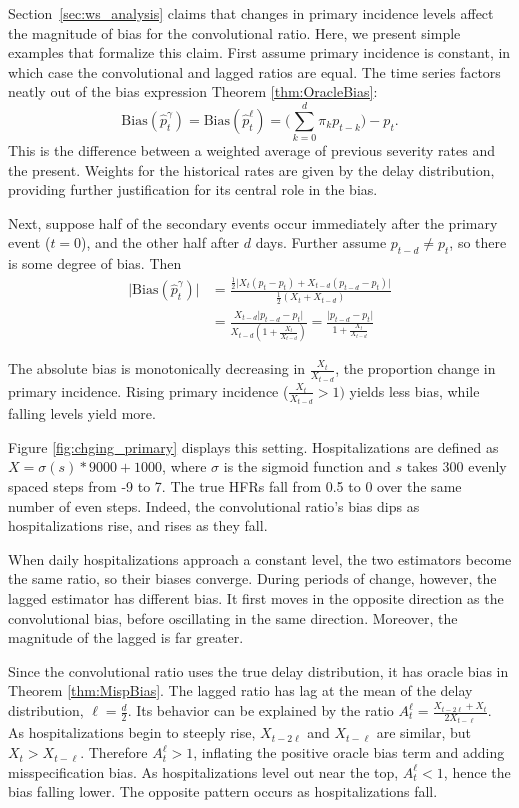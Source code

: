 \documentclass{article}
\begin{document}
Section~\ref{sec:ws_analysis} claims that changes in primary incidence levels affect the magnitude of bias for the convolutional ratio. Here, we present simple examples that formalize this claim. First assume primary incidence is constant, in which case the convolutional and lagged ratios are equal. The time series factors neatly out of the bias expression  Theorem \ref{thm:OracleBias}:
$$\text{Bias}(\hat{p}_t^{\gamma}) = \text{Bias}(\hat{p}_t^\ell) = \Big(\sum_{k=0}^d \pi_k p_{t-k}\Big)-p_t.$$
\noindent This is the difference between a weighted average of previous severity rates and the present. Weights for the historical rates are given by the delay distribution, providing further justification for its central role in the bias. 

Next, suppose half of the secondary events occur immediately after the primary event ($t=0$), and the other half after $d$ days. Further assume $p_{t-d}\neq p_t$, so there is some degree of bias. Then
\begin{align*}
    \lvert\text{Bias}(\hat{p}_t^{\gamma})\rvert &= \frac{\frac{1}{2}\big\lvert X_{t}(p_t-p_t) + X_{t-d}(p_{t-d}-p_t)\big\rvert}{\frac{1}{2}(X_{t}+X_{t-d})} \\
    &=\frac{X_{t-d}\lvert p_{t-d}-p_t\rvert}{X_{t-d}(1+\frac{X_{t}}{X_{t-d}})} = \frac{\lvert p_{t-d}-p_t \rvert}{1+\frac{X_{t}}{X_{t-d}}}
\end{align*}

The absolute bias is monotonically decreasing in $\frac{X_{t}}{X_{t-d}}$, the proportion change in primary incidence. Rising primary incidence ($\frac{X_{t}}{X_{t-d}}>1)$ yields less bias, while falling levels yield more.

Figure \ref{fig:chging_primary} displays this setting. Hospitalizations are defined as $X = \sigma(s)*9000+1000$, where $\sigma$ is the sigmoid function and $s$ takes 300 evenly spaced steps from -9 to 7. The true HFRs fall from 0.5 to 0 over the same number of even steps. Indeed, the convolutional ratio's bias dips as hospitalizations rise, and rises as they fall. 

When daily hospitalizations approach a constant level, the two estimators become the same ratio, so their biases converge. During periods of change, however, the lagged estimator has different bias. It first moves in the opposite direction as the convolutional bias, before oscillating in the same direction. Moreover, the magnitude of the lagged is far greater. 

Since the convolutional ratio uses the true delay distribution, it has oracle bias in Theorem \ref{thm:MispBias}. The lagged ratio has lag at the mean of the delay distribution, $\ell=\frac{d}{2}$. Its behavior can be explained by the ratio $A_t^\ell = \frac{X_{t-2\ell}+X_t}{2X_{t-\ell}}$. As hospitalizations begin to steeply rise, $X_{t-2\ell}$ and $X_{t-\ell}$ are similar, but $X_t > X_{t-\ell}$. Therefore $A_t^\ell>1$, inflating the positive oracle bias term and adding misspecification bias. As hospitalizations level out near the top, $A_t^\ell < 1$, hence the bias falling lower. The opposite pattern occurs as hospitalizations fall. 
\end{document}

